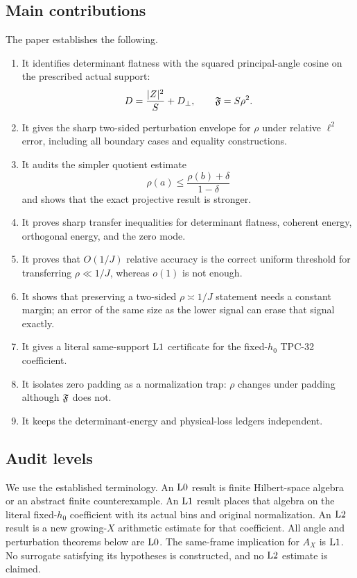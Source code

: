 \subsection{Main contributions}

The paper establishes the following.
\begin{enumerate}[label=(\roman*),leftmargin=2.3em]
\item It identifies determinant flatness with the squared
principal-angle cosine on the prescribed actual support:
\[
 D=\frac{|Z|^2}{S}+D_\perp,\qquad
 \mathfrak F=S\rho^2.
\]
\item It gives the sharp two-sided perturbation envelope for
\(\rho\) under relative \(\ell^2\) error, including all boundary
cases and equality constructions.
\item It audits the simpler quotient estimate
\[
 \rho(a)\le\frac{\rho(b)+\delta}{1-\delta}
\]
and shows that the exact projective result is stronger.
\item It proves sharp transfer inequalities for determinant
flatness, coherent energy, orthogonal energy, and the zero mode.
\item It proves that \(O(1/J)\) relative accuracy is the correct
uniform threshold for transferring \(\rho\ll1/J\), whereas \(o(1)\)
is not enough.
\item It shows that preserving a two-sided
\(\rho\asymp1/J\) statement needs a constant margin; an error of the
same size as the lower signal can erase that signal exactly.
\item It gives a literal same-support \(\mathrm{L1}\) certificate for the
fixed-\(h_0\) TPC-32 coefficient.
\item It isolates zero padding as a normalization trap:
\(\rho\) changes under padding although \(\mathfrak F\) does not.
\item It keeps the determinant-energy and physical-loss ledgers
independent.
\end{enumerate}

\subsection{Audit levels}

We use the established terminology.  An \(\mathrm{L0}\) result is finite
Hilbert-space algebra or an abstract finite counterexample.  An
\(\mathrm{L1}\) result places that algebra on the literal fixed-\(h_0\)
coefficient with its actual bins and original normalization.  An
\(\mathrm{L2}\) result is a new growing-\(X\) arithmetic estimate for that
coefficient.  All angle and perturbation theorems below are
\(\mathrm{L0}\).  The same-frame implication for \(A_X\) is \(\mathrm{L1}\).
No surrogate satisfying its hypotheses is constructed, and no
\(\mathrm{L2}\) estimate is claimed.
